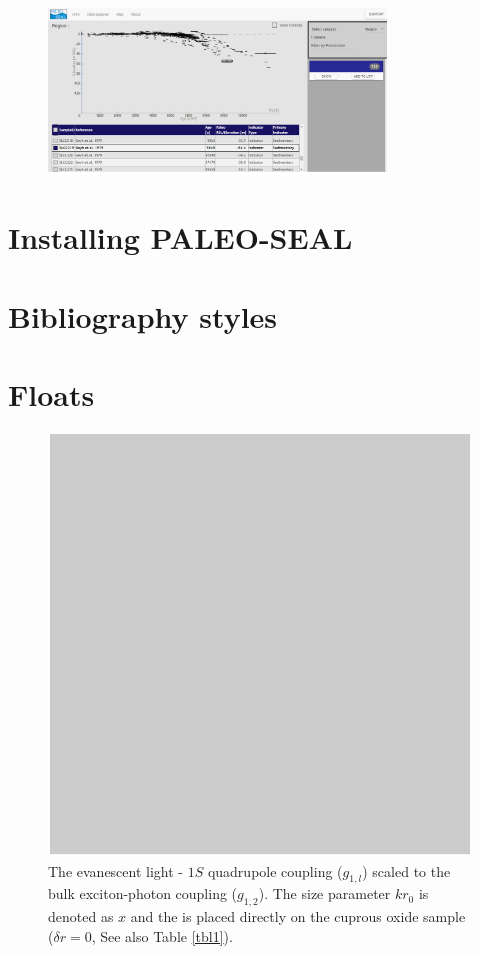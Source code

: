 \documentclass[a4paper,fleqn]{cas-dc}
\begin{document}
\begin{figure}
	\centering
	\includegraphics[width=0.8\textwidth]{figs/Figure2.png}
	\caption{}
	\label{fig:2}
\end{figure}

\section{Installing PALEO-SEAL}



\section{Bibliography styles}


\section{Floats}

\begin{figure}
	\centering
		\includegraphics[scale=.75]{figs/Fig1.pdf}
	\caption{The evanescent light - $1S$ quadrupole coupling
	($g_{1,l}$) scaled to the bulk exciton-photon coupling
	($g_{1,2}$). The size parameter $kr_{0}$ is denoted as $x$ and
	the \PMS is placed directly on the cuprous oxide sample ($\delta
	r=0$, See also Table \protect\ref{tbl1}).}
	\label{FIG:1}
\end{figure}
\end{document}
